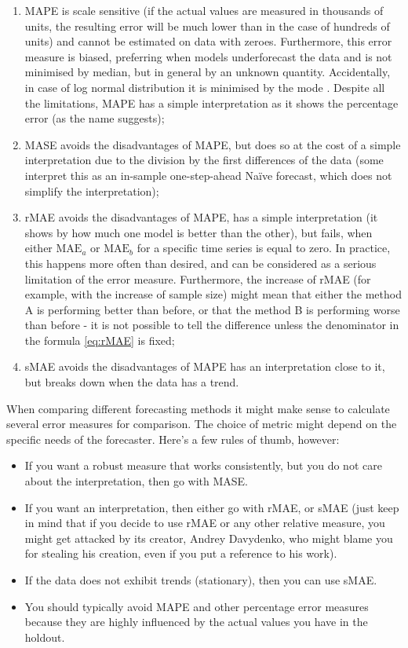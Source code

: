 \documentclass[
]{book}
\providecommand{\tightlist}{%
  \setlength{\itemsep}{0pt}\setlength{\parskip}{0pt}}
\theoremstyle{definition}
\theoremstyle{definition}
\theoremstyle{definition}
\theoremstyle{definition}
\theoremstyle{remark}
\begin{document}
\begin{enumerate}
\def\labelenumi{\arabic{enumi}.}
\tightlist
\item
  MAPE is scale sensitive (if the actual values are measured in thousands of units, the resulting error will be much lower than in the case of hundreds of units) and cannot be estimated on data with zeroes. Furthermore, this error measure is biased, preferring when models underforecast the data \citep[see for example,][]{Makridakis1993} and is not minimised by median, but in general by an unknown quantity. Accidentally, in case of log normal distribution it is minimised by the mode \citep[see discussion in][]{Kolassa2016}. Despite all the limitations, MAPE has a simple interpretation as it shows the percentage error (as the name suggests);
\item
  MASE avoids the disadvantages of MAPE, but does so at the cost of a simple interpretation due to the division by the first differences of the data (some interpret this as an in-sample one-step-ahead Naïve forecast, which does not simplify the interpretation);
\item
  rMAE avoids the disadvantages of MAPE, has a simple interpretation (it shows by how much one model is better than the other), but fails, when either \(\mathrm{MAE}_a\) or \(\mathrm{MAE}_b\) for a specific time series is equal to zero. In practice, this happens more often than desired, and can be considered as a serious limitation of the error measure. Furthermore, the increase of rMAE (for example, with the increase of sample size) might mean that either the method A is performing better than before, or that the method B is performing worse than before - it is not possible to tell the difference unless the denominator in the formula \eqref{eq:rMAE} is fixed;
\item
  sMAE avoids the disadvantages of MAPE has an interpretation close to it, but breaks down when the data has a trend.
\end{enumerate}

When comparing different forecasting methods it might make sense to calculate several error measures for comparison. The choice of metric might depend on the specific needs of the forecaster. Here's a few rules of thumb, however:

\begin{itemize}
\tightlist
\item
  If you want a robust measure that works consistently, but you do not care about the interpretation, then go with MASE.
\item
  If you want an interpretation, then either go with rMAE, or sMAE (just keep in mind that if you decide to use rMAE or any other relative measure, you might get attacked by its creator, Andrey Davydenko, who might blame you for stealing his creation, even if you put a reference to his work).
\item
  If the data does not exhibit trends (stationary), then you can use sMAE.
\item
  You should typically avoid MAPE and other percentage error measures because they are highly influenced by the actual values you have in the holdout.
\end{itemize}
\end{document}

